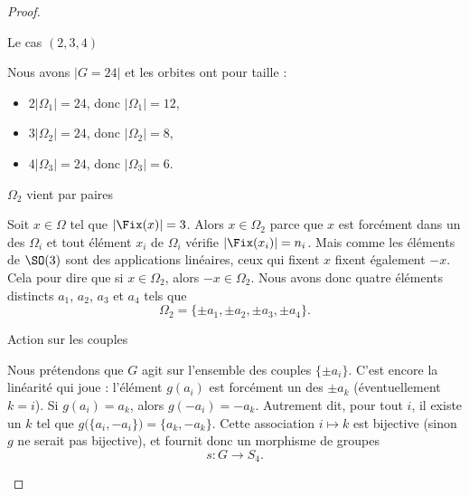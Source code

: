 \begin{proof}
\begin{subproof}
            \item[Le cas \( (2,3,4)\)]

                Nous avons \( | G=24 |\) et les orbites ont pour taille :
                \begin{itemize}
                    \item \( 2| \Omega_1 |=24\), donc \( | \Omega_1 |=12\),
                    \item \( 3| \Omega_2 |=24\), donc \( | \Omega_2 |=8\),
                    \item \( 4| \Omega_3 |=24\), donc  \( | \Omega_3 |=6\).
                \end{itemize}

                \begin{subproof}
                    \item[\( \Omega_2\) vient par paires]
                
                        Soit \( x\in \Omega\) tel que \( | \Fix(x) |=3\). Alors \( x\in\Omega_2\) parce que \( x\) est forcément dans un des \( \Omega_i\) et tout élément \( x_i\) de \( \Omega_i\) vérifie \( | \Fix(x_i) |=n_i\). Mais comme les éléments de \( \SO(3)\) sont des applications linéaires, ceux qui fixent \( x\) fixent également \( -x\). Cela pour dire que si \( x\in\Omega_2\), alors \( -x\in\Omega_2\). Nous avons donc quatre éléments distincts \( a_1\), \( a_2\), \( a_3\) et \( a_4\) tels que
                    \begin{equation}
                        \Omega_2=\{ \pm a_1,\pm a_2,\pm a_3,\pm a_4 \}.
                    \end{equation}
                    
                \item[Action sur les couples]

                    Nous prétendons que \( G\) agit sur l'ensemble des couples \( \{ \pm a_i \}\). C'est encore la linéarité qui joue : l'élément \( g(a_i)\) est forcément un des \( \pm a_k\) (éventuellement \( k=i\)). Si \( g(a_i)=a_k\), alors \( g(-a_i)=-a_k\). Autrement dit, pour tout \( i\), il existe un \( k\) tel que \( g\big( \{ a_i,-a_i \} \big)=\{ a_k,-a_k \}\). Cette association \( i\mapsto k\) est bijective (sinon \( g\) ne serait pas bijective), et fournit donc un morphisme de groupes
                    \begin{equation}
                        s\colon G\to S_4.
                    \end{equation}
                    

\end{subproof}
\end{subproof}
\end{proof}
